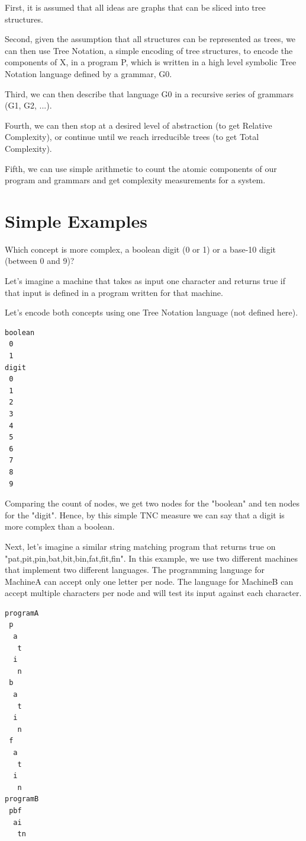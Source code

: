 \documentclass[journal]{IEEEtran}
\begin{document}
First, it is assumed that all ideas are graphs that can be sliced into tree structures.

Second, given the assumption that all structures can be represented as trees, we can then use Tree Notation, a simple encoding of tree structures, to encode the components of X, in a program P, which is written in a high level symbolic Tree Notation language defined by a grammar, G0.

Third, we can then describe that language G0 in a recursive series of grammars (G1, G2, ...).

Fourth, we can then stop at a desired level of abstraction (to get Relative Complexity), or continue until we reach irreducible trees (to get Total Complexity).

Fifth, we can use simple arithmetic to count the atomic components of our program and grammars and get complexity measurements for a system.

\section{Simple Examples}

Which concept is more complex, a boolean digit (0 or 1) or a base-10 digit (between 0 and 9)?

Let's imagine a machine that takes as input one character and returns true if that input is defined in a program written for that machine.

Let's encode both concepts using one Tree Notation language (not defined here).

\begin{lstlisting}
boolean
 0
 1
digit
 0
 1
 2
 3
 4
 5
 6
 7
 8
 9
\end{lstlisting}

Comparing the count of nodes, we get two nodes for the "boolean" and ten nodes for the "digit". Hence, by this simple TNC measure we can say that a digit is more complex than a boolean.

Next, let's imagine a similar string matching program that returns true on "pat,pit,pin,bat,bit,bin,fat,fit,fin". In this example, we use two different machines that implement two different languages. The programming language for MachineA can accept only one letter per node. The language for MachineB can accept multiple characters per node and will test its input against each character.


\begin{lstlisting}
programA
 p
  a
   t
  i
   n
 b
  a
   t
  i
   n
 f
  a
   t
  i
   n
programB
 pbf
  ai
   tn
\end{lstlisting}
\end{document}
